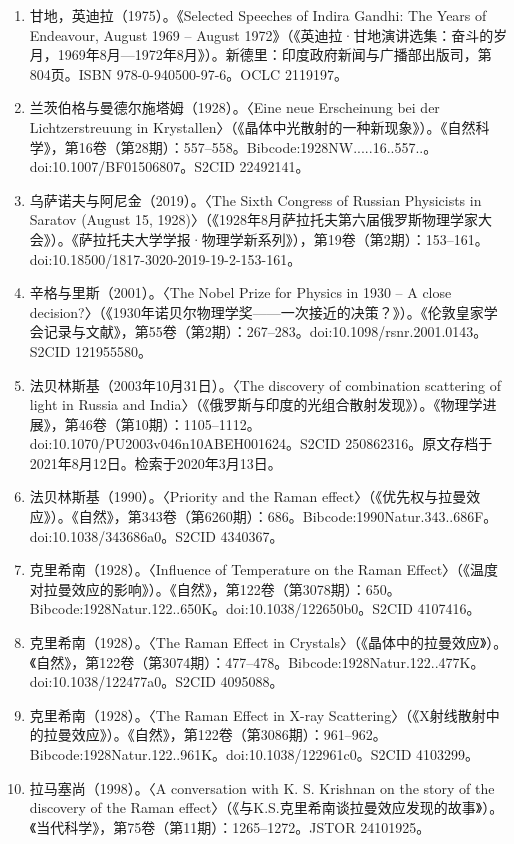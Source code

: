 \begin{enumerate}
\item 甘地，英迪拉（1975）。《Selected Speeches of Indira Gandhi: The Years of Endeavour, August 1969 – August 1972》（《英迪拉·甘地演讲选集：奋斗的岁月，1969年8月—1972年8月》）。新德里：印度政府新闻与广播部出版司，第804页。ISBN 978-0-940500-97-6。OCLC 2119197。
\item 兰茨伯格与曼德尔施塔姆（1928）。〈Eine neue Erscheinung bei der Lichtzerstreuung in Krystallen〉（《晶体中光散射的一种新现象》）。《自然科学》，第16卷（第28期）：557–558。Bibcode:1928NW.....16..557..。doi:10.1007/BF01506807。S2CID 22492141。
\item 乌萨诺夫与阿尼金（2019）。〈The Sixth Congress of Russian Physicists in Saratov (August 15, 1928)〉（《1928年8月萨拉托夫第六届俄罗斯物理学家大会》）。《萨拉托夫大学学报·物理学新系列》），第19卷（第2期）：153–161。doi:10.18500/1817-3020-2019-19-2-153-161。
\item 辛格与里斯（2001）。〈The Nobel Prize for Physics in 1930 – A close decision?〉（《1930年诺贝尔物理学奖——一次接近的决策？》）。《伦敦皇家学会记录与文献》，第55卷（第2期）：267–283。doi:10.1098/rsnr.2001.0143。S2CID 121955580。
\item 法贝林斯基（2003年10月31日）。〈The discovery of combination scattering of light in Russia and India〉（《俄罗斯与印度的光组合散射发现》）。《物理学进展》，第46卷（第10期）：1105–1112。doi:10.1070/PU2003v046n10ABEH001624。S2CID 250862316。原文存档于2021年8月12日。检索于2020年3月13日。
\item 法贝林斯基（1990）。〈Priority and the Raman effect〉（《优先权与拉曼效应》）。《自然》，第343卷（第6260期）：686。Bibcode:1990Natur.343..686F。doi:10.1038/343686a0。S2CID 4340367。
\item 克里希南（1928）。〈Influence of Temperature on the Raman Effect〉（《温度对拉曼效应的影响》）。《自然》，第122卷（第3078期）：650。Bibcode:1928Natur.122..650K。doi:10.1038/122650b0。S2CID 4107416。
\item 克里希南（1928）。〈The Raman Effect in Crystals〉（《晶体中的拉曼效应》）。《自然》，第122卷（第3074期）：477–478。Bibcode:1928Natur.122..477K。doi:10.1038/122477a0。S2CID 4095088。
\item 克里希南（1928）。〈The Raman Effect in X-ray Scattering〉（《X射线散射中的拉曼效应》）。《自然》，第122卷（第3086期）：961–962。Bibcode:1928Natur.122..961K。doi:10.1038/122961c0。S2CID 4103299。
\item 拉马塞尚（1998）。〈A conversation with K. S. Krishnan on the story of the discovery of the Raman effect〉（《与K.S.克里希南谈拉曼效应发现的故事》）。《当代科学》，第75卷（第11期）：1265–1272。JSTOR 24101925。

\end{enumerate}
